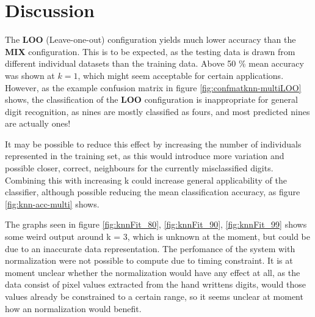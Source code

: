 \section{Discussion}
The \textbf{LOO} (Leave-one-out) configuration
yields much lower accuracy than the \textbf{MIX} configuration.
This is to be expected, as the testing data is drawn from different individual datasets
than the training data. Above 50 \% mean accuracy was shown at \(k=1\),
which might seem acceptable for certain applications.
However, as the example confusion matrix in figure \ref{fig:confmatknn-multiLOO} shows,
the classification of the \textbf{LOO} configuration is inappropriate
for general digit recognition, as nines are mostly classified as fours,
and most predicted nines are actually ones!

It may be possible to reduce this effect by increasing the number
of individuals represented in the training set, as this would introduce more
variation and possible closer, correct, neighbours for the currently
misclassified digits.
Combining this with increasing k could increase general applicability of the classifier,
although possible reducing the mean classification accuracy,
as figure \ref{fig:knn-acc-multi} shows.



The graphs seen in figure \ref{fig:knnFit_80}, \ref{fig:knnFit_90}, \ref{fig:knnFit_99} 
shows some weird output around k = 3, which is unknown at the moment, but could be
due to an inaccurate data representation.  The perfomance of the system with normalization 
were not possible to compute due to timing constraint. It is at moment unclear whether the normalization would have any effect at all, as the data consist of pixel values extracted from the 
hand writtens digits, would those values  already be constrained to a certain range, so it seems unclear at moment how an normalization would benefit.   